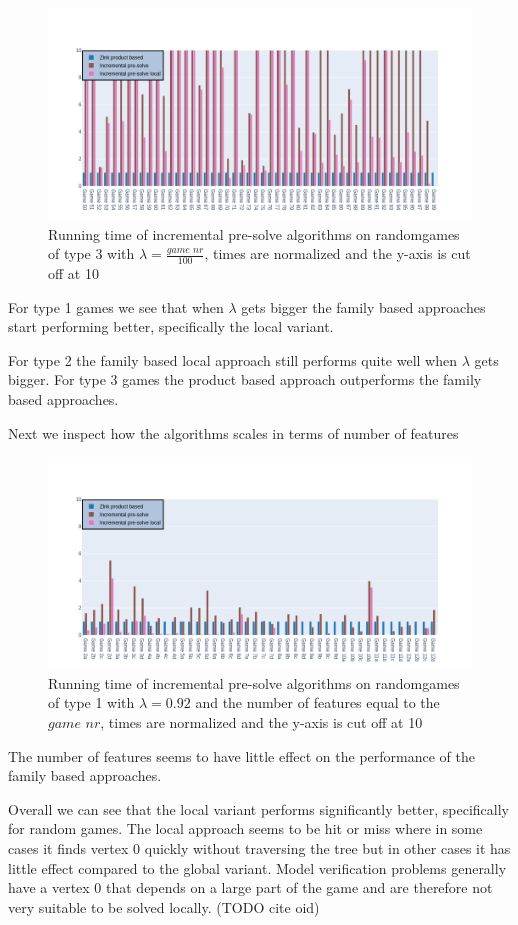 \begin{figure}[H]
	\includegraphics[width=1\linewidth]{"results/BC_randomgames/Zlnk product based_Incremental pre-solve_Incremental pre-solve local_"}
	\caption{Running time of incremental pre-solve algorithms on randomgames of type 3 with $\lambda = \frac{\textit{game nr}}{100}$, times are normalized and the y-axis is cut off at 10}
	\label{fig:elevatorzlnks}
\end{figure}%
For type 1 games we see that when $\lambda$ gets bigger the family based approaches start performing better, specifically the local variant.

For type 2 the family based local approach still performs quite well when $\lambda$ gets bigger. For type 3 games the product based approach outperforms the family based approaches.

Next we inspect how the algorithms scales in terms of number of features
\begin{figure}[H]
	\includegraphics[width=1\linewidth]{"results/randomscalegames/Zlnk product based_Incremental pre-solve_Incremental pre-solve local_"}
	\caption{Running time of incremental pre-solve algorithms on randomgames of type 1 with $\lambda = 0.92$ and the number of features equal to the $\textit{game nr}$, times are normalized and the y-axis is cut off at 10}
	\label{fig:elevatorzlnks}
\end{figure}%
The number of features seems to have little effect on the performance of the family based approaches.

Overall we can see that the local variant performs significantly better, specifically for random games. The local approach seems to be hit or miss where in some cases it finds vertex $0$ quickly without traversing the tree but in other cases it has little effect compared to the global variant. Model verification problems generally have a vertex $0$ that depends on a large part of the game and are therefore not very suitable to be solved locally. (TODO cite oid)